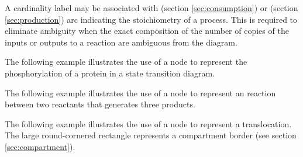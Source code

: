 A cardinality label may be associated with  (section \ref{sec:consumption}) or 
 (section \ref{sec:production}) arc indicating the stoichiometry of a process. This is required to eliminate ambiguity when the exact composition of the number of copies of the inputs or outputs to a reaction are ambiguous from the diagram. 

The following example illustrates the use of a  node to 
represent the phosphorylation of a protein in a state transition diagram.

\begin{center}
\end{center}

The following example illustrates the use of a  node to represent an reaction between two reactants that generates three products. 

\begin{center}
\end{center}

The following example illustrates the use of a  node to represent a translocation. The large round-cornered rectangle represents a compartment border (see section \ref{sec:compartment}).

